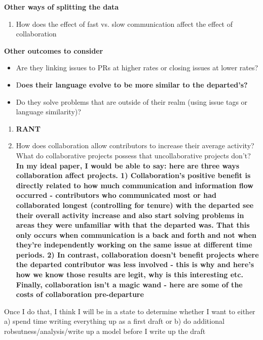 \documentclass[12pt,notitlepage]{article}
\begin{document}

\textbf{Other ways of splitting the data}
\begin{enumerate}
    \item How does the effect of fast vs. slow communication affect the effect of collaboration
\end{enumerate}
\textbf{Other outcomes to consider}
\begin{itemize}
    \item Are they linking issues to PRs at higher rates or closing issues at lower rates?
    \item D\textbf{oes their language evolve to be more similar to the departed's?}
    \item Do they solve problems that are outside of their realm (using issue tags or language similarity)?
\end{itemize}
    
\begin{enumerate}
    \item \textbf{RANT}
    \item How does collaboration allow contributors to increase their average activity? What do collaborative projects possess that uncollaborative projects don't?\\
    \textbf{In my ideal paper, I would be able to say: here are three ways collaboration affect projects. 1) Collaboration's positive benefit is directly related to how much communication and information flow occurred - contributors who communicated most or had collaborated longest (controlling for tenure) with the departed see their overall activity increase and also start solving problems in areas they were unfamiliar with that the departed was. That this only occurs when communication is a back and forth and not when they're independently working on the same issue at different time periods. 2) In contrast, collaboration doesn't benefit projects where the departed contributor was less involved - this is why and here's how we know those results are legit, why is this interesting etc. Finally, collaboration isn't a magic wand - here are some of the costs of collaboration pre-departure}
\end{enumerate}

    
Once I do that, I think I will be in a state to determine whether I want to either a) spend time writing everything up as a first draft or b) do additional robsutness/analysis/write up a model before I write up the draft
\end{document}
